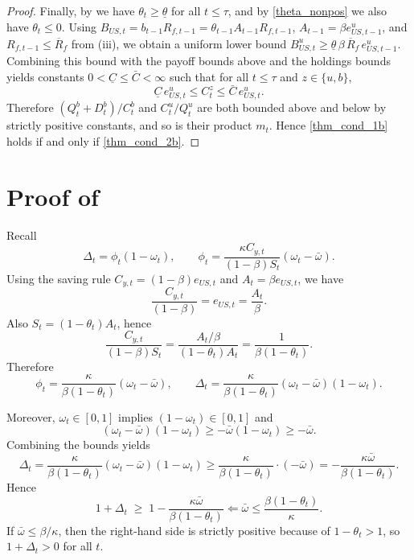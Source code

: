 \documentclass[12pt]{article}
\theoremstyle{plain}
\begin{document}
\begin{proof}
Finally, by  we have $\theta_t\ge \underline\theta$ for all $t\le\tau$, and by \eqref{theta_nonpos} we also have
$\theta_t\le 0$. Using $B_{US,t}=b_{t-1}R_{f,t-1}=\theta_{t-1}A_{t-1}R_{f,t-1}$, $A_{t-1}=\beta e_{US,t-1}^u$, and
$R_{f,t-1}\le \overline R_f$ from (iii), we obtain a uniform lower bound
$B_{US,t}^u \ge \underline\theta\,\beta\,\overline R_f\,e_{US,t-1}^u$.
Combining this bound with the payoff bounds above and the holdings bounds yields constants
$0<\underline C\le \bar C<\infty$ such that for all $t\le\tau$ and $z\in\{u,b\}$,
\[
\underline C\,e_{US,t}^u \le C_t^z \le \bar C\,e_{US,t}^u.
\]
Therefore $(Q_t^b+D_t^b)/C_t^b$ and $C_t^u/Q_t^u$ are both bounded above and below by strictly positive constants, and so
is their product $m_t$. Hence \eqref{thm_cond_1b} holds if and only if \eqref{thm_cond_2b}.
\end{proof}




\appendix
\section{Proof of }
Recall
\[
\Delta_t=\phi_t(1-\omega_t),\qquad 
\phi_t=\frac{\kappa C_{y,t}}{(1-\beta)S_t}(\omega_t-\bar\omega).
\]
Using the saving rule $C_{y,t}=(1-\beta)e_{US,t}$ and $A_t=\beta e_{US,t}$, we have
\[
\frac{C_{y,t}}{(1-\beta)}=e_{US,t}=\frac{A_t}{\beta}.
\]
Also $S_t=(1-\theta_t)A_t$, hence
\[
\frac{C_{y,t}}{(1-\beta)S_t}
=\frac{A_t/\beta}{(1-\theta_t)A_t}
=\frac{1}{\beta(1-\theta_t)}.
\]
Therefore
\[
\phi_t=\frac{\kappa}{\beta(1-\theta_t)}(\omega_t-\bar\omega),
\qquad
\Delta_t=\frac{\kappa}{\beta(1-\theta_t)}(\omega_t-\bar\omega)(1-\omega_t).
\]

Moreover, $\omega_t\in[0,1]$ implies $(1-\omega_t)\in[0,1]$ and
\[
(\omega_t-\bar\omega)(1-\omega_t)\ge -\bar\omega(1-\omega_t)\ge -\bar\omega.
\]
Combining the bounds yields
\[
\Delta_t
=\frac{\kappa}{\beta(1-\theta_t)}(\omega_t-\bar\omega)(1-\omega_t)
\ge \frac{\kappa}{\beta(1-\theta_t)}\cdot(-\bar\omega)
= -\frac{\kappa\bar\omega}{\beta(1-\theta_t)}.
\]
Hence
\[
1+\Delta_t \;\ge\; 1-\frac{\kappa\bar\omega}{\beta(1-\theta_t)} 
\Longleftarrow \bar \omega \leq \frac{\beta(1-\theta_t)}{\kappa}.
\]
If $\bar\omega \leq \beta/\kappa$, then the right-hand side is strictly positive because of 
$1-\theta_t > 1$, so
$1+\Delta_t>0$ for all $t$.
\medskip

 
\end{document}
